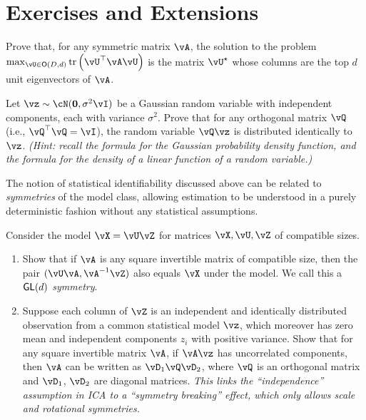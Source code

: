 \documentclass[../../book-main.tex]{subfiles}
\begin{document}
\section{Exercises and Extensions}


\begin{exercise}\label{exercise:principal-components-derivation}
    Prove that, for any symmetric matrix \(\vA\), the solution to the problem
    \(\max_{\vU \in \O(D, d)}\tr\left(\vU^{\top}\vA\vU\right)\) is the matrix
    \(\vU^{\star}\) whose columns are the top \(d\) unit eigenvectors of \(\vA\).
\end{exercise}

\begin{exercise}\label{exercise:gaussian-rot-invar}
    Let $\vz \sim \cN(\Zero, \sigma^2 \vI)$ be a Gaussian random variable with independent components, each with variance $\sigma^2$. 
    Prove that for any orthogonal matrix $\vQ$ (i.e., $\vQ^\top \vQ = \vI$), the random variable $\vQ \vz$ is distributed identically to $\vz$. 
    \textit{(Hint: recall the formula for the Gaussian probability density function, and the formula for the density of a linear function of a random variable.) }
\end{exercise}

\begin{exercise}\label{exercise:symmetry-identifiability}
    The notion of statistical identifiability discussed above can be related to \textit{symmetries} of the model class, allowing estimation to be understood in a purely deterministic fashion without any statistical assumptions.

    Consider the model $\vX = \vU \vZ$ for matrices $\vX, \vU, \vZ$ of compatible sizes.
    \begin{enumerate}
        \item Show that if $\vA$ is any square invertible matrix of compatible size, then the pair
        $(\vU \vA, \vA^{-1} \vZ)$ also equals $\vX$ under the model. We call this a \textit{$\mathsf{GL}(d)$ symmetry}.
        \item Suppose each column of $\vZ$ is an independent and identically distributed observation from a common statistical model $\vz$, which moreover has zero mean and independent components $z_i$ with positive variance.
        Show that for any square invertible matrix $\vA$, if $\vA \vz$ has uncorrelated components, then $\vA$ can be written as $\vD_1 \vQ \vD_2$, where $\vQ$ is an orthogonal matrix and $\vD_1$, $\vD_2$ are diagonal matrices.
        \textit{This links the ``independence'' assumption in ICA to a ``symmetry breaking'' effect, which only allows scale and rotational symmetries.}
    \end{enumerate}

\end{exercise}
\end{document}
